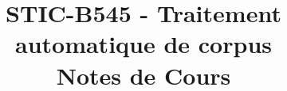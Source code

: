 
\graphicspath{{images/}}

\title{STIC-B545 - Traitement automatique de corpus \\ Notes de Cours}


\maketitle
\tableofcontents
\newpage


\newpage


